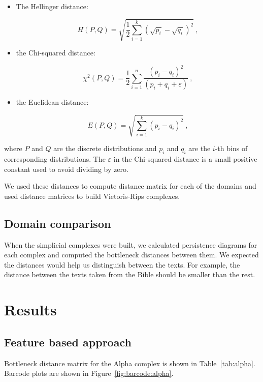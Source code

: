 \documentclass[12pt,a4paper]{amsart}
\begin{document}
\begin{itemize}
\item The Hellinger distance:

\begin{equation*}
  H(P,Q) = \sqrt{\frac{1}{2} \sum_{i=1}^k\left(\sqrt{p_i} -
    \sqrt{q_i}\right)^2}\ ,
\end{equation*}

\item the Chi-squared distance:

\begin{equation*}
  \chi^2(P,Q) = \frac{1}{2}\sum _{i=1}^n\frac{(p_i - q_i)^2}{(p_i + q_i + \varepsilon)}\ ,
\end{equation*}

\item the Euclidean distance:

\begin{equation*}
  E(P,Q) = \sqrt{\sum_{i=1}^k\left(p_i - q_i\right)^2}\ ,
\end{equation*}
\end{itemize}

\noindent
where $P$ and $Q$ are the discrete distributions and $p_i$ and $q_i$ are the
$i$-th bins of corresponding distributions. The $\varepsilon$ in the Chi-squared
distance is a small positive constant used to avoid dividing by zero.

We used these distances to compute distance matrix for each of the
domains and used distance matrices to build Vietoris-Rips complexes.

\subsection{Domain comparison}

When the simplicial complexes were built, we calculated persistence diagrams for
each complex and computed the bottleneck distances between them. We expected the
distances would help us distinguish between the texts. For example, the distance
between the texts taken from the Bible should be smaller than the rest.

\section{Results}

\subsection{Feature based approach} Bottleneck
distance matrix for the Alpha complex is shown in Table~\ref{tab:alpha}.
Barcode plots are shown in Figure~\ref{fig:barcode:alpha}.
\end{document}
